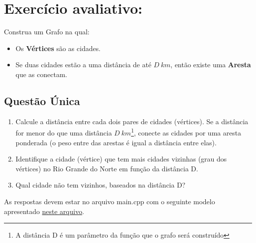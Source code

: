 \documentclass[12pt,a4paper]{article}
\begin{document}
\newpage

\section*{Exercício avaliativo:}

Construa um Grafo na qual:

\begin{itemize}
    \item Os \textbf{Vértices} são as cidades.
    \item Se duas cidades estão a uma distância de até $D\ km$, então existe uma \textbf{Aresta} que as conectam.
\end{itemize}

\subsection*{Questão Única}
\begin{enumerate}[label=\Roman*)]
    \item Calcule a distância entre cada dois pares de cidades (vértices). Se a distância for menor do que uma distância $D\ km$\footnote{A distância D é um parâmetro da função que o grafo será construído}, conecte as cidades por uma aresta ponderada (o peso entre das arestas é igual a distância entre elas).
    \item Identifique a cidade (vértice) que tem mais cidades vizinhas (grau dos vértices) no Rio Grande do Norte em função da distância D.
    \item Qual cidade não tem vizinhos, baseados na distância D?
    \end{enumerate}

    As respostas devem estar no arquivo main.cpp com o seguinte modelo apresentado \href{https://github.com/kennedyufersa/scriptLab/blob/main/main.cpp}{neste arquivo}.
\end{document}
